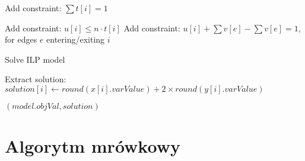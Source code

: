 \begin{algorithm}
\begin{algorithmic}[1]
            \State Add constraint: $\sum t[i] = 1$ 
    
             
                \State Add constraint: $u[i] \leq n \cdot t[i]$
                \State Add constraint: $u[i] + \sum v[e] - \sum v[e] = 1$, for edges $e$ entering/exiting $i$
            \EndFor
    
            \State Solve ILP model
    
            \State Extract solution:
                \State $solution[i] \gets round(x[i].varValue) + 2 \times round(y[i].varValue)$
            \EndFor
    
            \State \Return $(model.objVal, solution)$
        \EndFunction
    \end{algorithmic}
    \end{algorithm}

\section{Algorytm mrówkowy}

